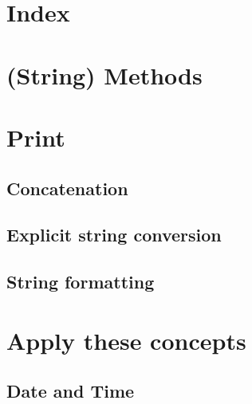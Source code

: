 	\section{Index}
	
	
	\section{(String) Methods}
	
	
	\section{Print}
	
		\subsection{Concatenation}
		
		\subsection{Explicit string conversion}
		
		\subsection{String formatting}
		
	\section{Apply these concepts}
	
		\subsection{Date and Time}
		
